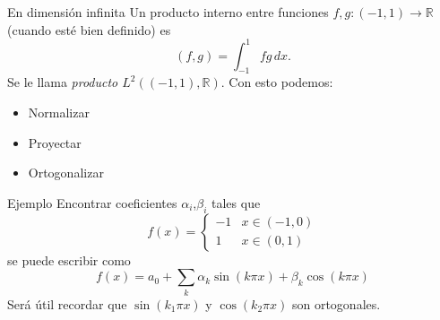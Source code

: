 \documentclass[12pt,aspectratio=169,xcolor=dvipsnames]{beamer}
\newcommand{\R}{\mathbb{R}}
\begin{document}
\begin{frame}{En dimensión infinita}
    Un producto interno entre funciones $f,g:(-1,1)\to \R$ (cuando esté bien definido) es
    $$ (f,g) = \int_{-1}^1 fg\,dx.$$
    Se le llama \emph{producto $L^2((-1,1),\R)$}. Con esto podemos: 
        \begin{itemize}
            \item Normalizar
            \item Proyectar
            \item Ortogonalizar
        \end{itemize}
\end{frame}
\begin{frame}{Ejemplo}
    Encontrar coeficientes $\alpha_i$,$\beta_i$ tales que
        $$ f(x) = \begin{cases} -1 & x \in (-1,0) \\ 1 & x \in (0,1) \end{cases} $$
    se puede escribir como
        $$ f(x) = a_0 + \sum_k \alpha_k \sin(k\pi x) + \beta_k\cos(k\pi x) $$
    Será útil recordar que $\sin(k_1\pi x)$ y $\cos(k_2\pi x)$ son ortogonales.
\end{frame}
\begin{frame}
    \maketitle
\end{frame}
\end{document}
